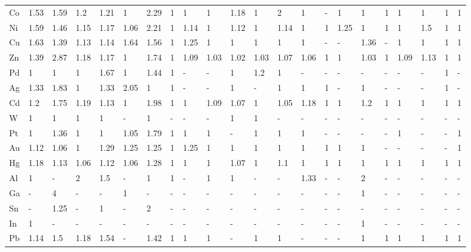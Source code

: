 \begin{tabular}{llllllllllllllllllllll}
	Co & 1.53 & 1.59 & 1.2  & 1.21 & 1    & 2.29 & 1    & 1    & 1    & 1.18 & 1    & 2    & 1    & -    & 1    & 1    & 1    & 1    & 1    & 1    & 1    \\
	Ni & 1.59 & 1.46 & 1.15 & 1.17 & 1.06 & 2.21 & 1    & 1.14 & 1    & 1.12 & 1    & 1.14 & 1    & 1    & 1.25 & 1    & 1    & 1    & 1.5  & 1    & 1    \\
	Cu & 1.63 & 1.39 & 1.13 & 1.14 & 1.64 & 1.56 & 1    & 1.25 & 1    & 1    & 1    & 1    & 1    & -    & -    & 1.36 & -    & 1    & 1    & 1    & 1    \\
	Zn & 1.39 & 2.87 & 1.18 & 1.17 & 1    & 1.74 & 1    & 1.09 & 1.03 & 1.02 & 1.03 & 1.07 & 1.06 & 1    & 1    & 1.03 & 1    & 1.09 & 1.13 & 1    & 1    \\
	Pd & 1    & 1    & 1    & 1.67 & 1    & 1.44 & 1    & -    & -    & 1    & 1.2  & 1    & -    & -    & -    & -    & -    & -    & -    & 1    & -    \\
	Ag & 1.33 & 1.83 & 1    & 1.33 & 2.05 & 1    & 1    & -    & -    & 1    & -    & 1    & 1    & 1    & -    & 1    & -    & -    & -    & 1    & -    \\
	Cd & 1.2  & 1.75 & 1.19 & 1.13 & 1    & 1.98 & 1    & 1    & 1.09 & 1.07 & 1    & 1.05 & 1.18 & 1    & 1    & 1.2  & 1    & 1    & 1    & 1    & 1    \\
	W  & 1    & 1    & 1    & 1    & -    & 1    & -    & -    & -    & 1    & 1    & -    & -    & -    & -    & -    & -    & -    & -    & -    & -    \\
	Pt & 1    & 1.36 & 1    & 1    & 1.05 & 1.79 & 1    & 1    & 1    & -    & 1    & 1    & 1    & -    & -    & -    & -    & 1    & -    & -    & 1    \\
	Au & 1.12 & 1.06 & 1    & 1.29 & 1.25 & 1.25 & 1    & 1.25 & 1    & 1    & 1    & 1    & 1    & 1    & 1    & 1    & -    & -    & -    & -    & 1    \\
	Hg & 1.18 & 1.13 & 1.06 & 1.12 & 1.06 & 1.28 & 1    & 1    & 1    & 1.07 & 1    & 1.1  & 1    & 1    & 1    & 1    & 1    & 1    & 1    & 1    & 1    \\
	Al & 1    & -    & 2    & 1.5  & -    & 1    & 1    & -    & 1    & 1    & -    & -    & 1.33 & -    & -    & 2    & -    & -    & -    & -    & -    \\
	Ga & -    & 4    & -    & -    & 1    & -    & -    & -    & -    & -    & -    & -    & -    & -    & -    & 1    & -    & -    & -    & -    & -    \\
	Sn & -    & 1.25 & -    & 1    & -    & 2    & -    & -    & -    & -    & -    & -    & -    & -    & -    & -    & -    & -    & -    & -    & -    \\
	In & 1    & -    & -    & -    & -    & -    & -    & -    & -    & -    & -    & -    & -    & -    & -    & 1    & -    & -    & -    & -    & -    \\
	Pb & 1.14 & 1.5  & 1.18 & 1.54 & -    & 1.42 & 1    & 1    & 1    & -    & 1    & 1    & -    & -    & -    & 1    & 1    & 1    & 1    & 1    & 1  \\
	\bottomrule
\end{tabular}